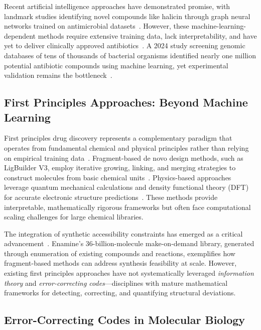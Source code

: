 \documentclass[12pt,a4paper]{article}
\begin{document}
Recent artificial intelligence approaches have demonstrated promise, with landmark studies identifying novel compounds like halicin through graph neural networks trained on antimicrobial datasets~\cite{Cesaro2023DeepLearning}. However, these machine-learning-dependent methods require extensive training data, lack interpretability, and have yet to deliver clinically approved antibiotics~\cite{Pharmaceuticals2024AI}. A 2024 study screening genomic databases of tens of thousands of bacterial organisms identified nearly one million potential antibiotic compounds using machine learning, yet experimental validation remains the bottleneck~\cite{Cesaro2023DeepLearning}.

\subsection{First Principles Approaches: Beyond Machine Learning}

First principles drug discovery represents a complementary paradigm that operates from fundamental chemical and physical principles rather than relying on empirical training data~\cite{Leung2024DeNovo}. Fragment-based de novo design methods, such as LigBuilder V3, employ iterative growing, linking, and merging strategies to construct molecules from basic chemical units~\cite{LigBuilderV3}. Physics-based approaches leverage quantum mechanical calculations and density functional theory (DFT) for accurate electronic structure predictions~\cite{Bui2021DFT,Parida2025CDFT}. These methods provide interpretable, mathematically rigorous frameworks but often face computational scaling challenges for large chemical libraries.

The integration of synthetic accessibility constraints has emerged as a critical advancement~\cite{Leung2024DeNovo}. Enamine's 36-billion-molecule make-on-demand library, generated through enumeration of existing compounds and reactions, exemplifies how fragment-based methods can address synthesis feasibility at scale. However, existing first principles approaches have not systematically leveraged \textit{information theory} and \textit{error-correcting codes}---disciplines with mature mathematical frameworks for detecting, correcting, and quantifying structural deviations.

\subsection{Error-Correcting Codes in Molecular Biology}
\end{document}
